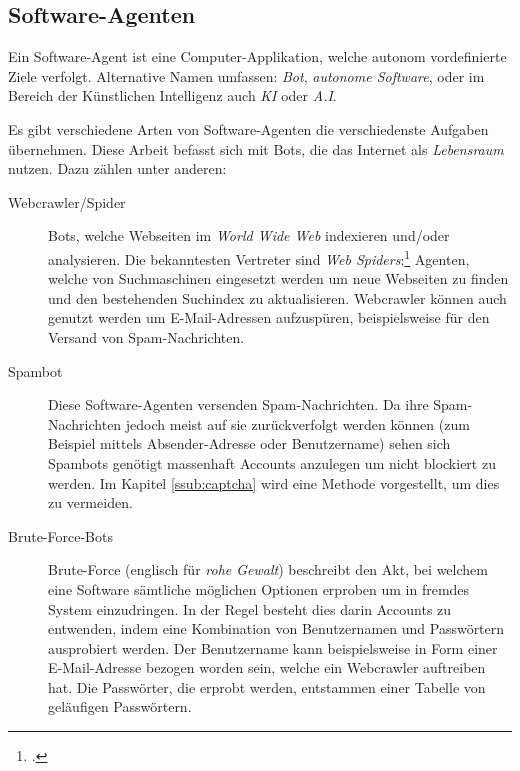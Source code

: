 \subsection{Software-Agenten}
\label{sub:software_agenten}
Ein Software-Agent ist eine Computer-Applikation, welche autonom vordefinierte
Ziele verfolgt. Alternative Namen umfassen: \emph{Bot}, \emph{autonome
Software}, oder im Bereich der Künstlichen Intelligenz auch \emph{KI} oder
\emph{A.I}.

Es gibt verschiedene Arten von Software-Agenten die verschiedenste Aufgaben
übernehmen. Diese Arbeit befasst sich mit Bots, die das Internet als
\emph{Lebensraum} nutzen. Dazu zählen unter anderen:

\begin{description}
  \item[Webcrawler/Spider]\label{term:spider}
  Bots, welche Webseiten im \emph{World Wide Web} indexieren und/oder
  analysieren. Die bekanntesten Vertreter sind \emph{Web
  Spiders}:\footcite{wa:tkWWWRobot} Agenten, welche von Suchmaschinen eingesetzt
  werden um neue Webseiten zu finden und den bestehenden Suchindex zu
  aktualisieren. Webcrawler können auch genutzt werden um E-Mail-Adressen
  aufzuspüren, beispielsweise für den Versand von Spam-Nachrichten.
  
  \item[Spambot]
  Diese Software-Agenten versenden Spam-Nachrichten. Da ihre Spam-Nachrichten
  jedoch meist auf sie zurückverfolgt werden können (zum Beispiel mittels
  Absender-Adresse oder Benutzername) sehen sich Spambots genötigt massenhaft
  Accounts anzulegen um nicht blockiert zu werden. Im Kapitel
  \ref{ssub:captcha} wird eine Methode vorgestellt, um dies zu vermeiden.
  
  \item[Brute-Force-Bots]
  Brute-Force (englisch für \emph{rohe Gewalt}) beschreibt den Akt, bei welchem
  eine Software sämtliche möglichen Optionen erproben um in fremdes System
  einzudringen. In der Regel besteht dies darin Accounts zu entwenden, indem
  eine Kombination von Benutzernamen und Passwörtern ausprobiert werden. Der
  Benutzername kann beispielsweise in Form einer E-Mail-Adresse bezogen worden
  sein, welche ein Webcrawler auftreiben hat. Die Passwörter, die erprobt
  werden, entstammen einer Tabelle von geläufigen Passwörtern.
\end{description}

